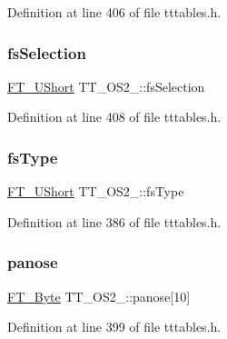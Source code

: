 Definition at line 406 of file tttables.\+h.

\mbox{\label{struct_t_t___o_s2___a12e9e1f0b21f424715c881d9f4e012ce}} 
\subsubsection{\texorpdfstring{fsSelection}{fsSelection}}
{\footnotesize\ttfamily \mbox{\hyperlink{fttypes_8h_a937f6c17cf5ffd09086d8610c37b9f58}{F\+T\+\_\+\+U\+Short}} T\+T\+\_\+\+O\+S2\+\_\+\+::fs\+Selection}



Definition at line 408 of file tttables.\+h.

\mbox{\label{struct_t_t___o_s2___ad7e436778424fe4dbe53ca8bd2a975c7}} 
\subsubsection{\texorpdfstring{fsType}{fsType}}
{\footnotesize\ttfamily \mbox{\hyperlink{fttypes_8h_a937f6c17cf5ffd09086d8610c37b9f58}{F\+T\+\_\+\+U\+Short}} T\+T\+\_\+\+O\+S2\+\_\+\+::fs\+Type}



Definition at line 386 of file tttables.\+h.

\mbox{\label{struct_t_t___o_s2___a3908fb0cb6db5287e559b8298884673a}} 
\subsubsection{\texorpdfstring{panose}{panose}}
{\footnotesize\ttfamily \mbox{\hyperlink{fttypes_8h_a51f26183ca0c9f4af958939648caeccd}{F\+T\+\_\+\+Byte}} T\+T\+\_\+\+O\+S2\+\_\+\+::panose\mbox{[}10\mbox{]}}



Definition at line 399 of file tttables.\+h.

\mbox{\label{struct_t_t___o_s2___ac755913b648d535d1207927e4a6f1ec0}} 
